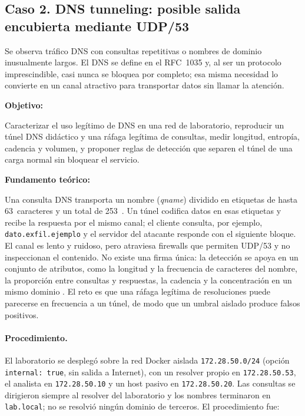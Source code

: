 \subsection{Caso 2. DNS tunneling: posible salida encubierta mediante UDP/53}
\label{caso:dns-tunneling}

\begin{situacion}
Se observa tráfico DNS con consultas repetitivas o nombres de dominio inusualmente largos. El DNS se define en el RFC~1035 \parencite{rfc1035} y, al ser un protocolo imprescindible, casi nunca se bloquea por completo; esa misma necesidad lo convierte en un canal atractivo para transportar datos sin llamar la atención.

\textbf{Objetivo:} \par
Caracterizar el uso legítimo de DNS en una red de laboratorio, reproducir un túnel DNS didáctico y una ráfaga legítima de consultas, medir longitud, entropía, cadencia y volumen, y proponer reglas de detección que separen el túnel de una carga normal sin bloquear el servicio.

\textbf{Fundamento teórico:} \par
Una consulta DNS transporta un nombre (\textit{qname}) dividido en etiquetas de hasta 63~caracteres y un total de 253~\parencite{rfc1035}. Un túnel codifica datos en esas etiquetas y recibe la respuesta por el mismo canal; el cliente consulta, por ejemplo, \texttt{dato.exfil.ejemplo} y el servidor del atacante responde con el siguiente bloque. El canal es lento y ruidoso, pero atraviesa firewalls que permiten UDP/53 y no inspeccionan el contenido. No existe una firma única: la detección se apoya en un conjunto de atributos, como la longitud y la frecuencia de caracteres del nombre, la proporción entre consultas y respuestas, la cadencia y la concentración en un mismo dominio \parencite{amirov2025dns,born2010character,petrov2025domainator}. El reto es que una ráfaga legítima de resoluciones puede parecerse en frecuencia a un túnel, de modo que un umbral aislado produce falsos positivos.
\end{situacion}

\paragraph{Procedimiento.}
El laboratorio se desplegó sobre la red Docker aislada \texttt{172.28.50.0/24} (opción \texttt{internal: true}, sin salida a Internet), con un resolver propio en \texttt{172.28.50.53}, el analista en \texttt{172.28.50.10} y un host pasivo en \texttt{172.28.50.20}. Las consultas se dirigieron siempre al resolver del laboratorio y los nombres terminaron en \texttt{lab.local}; no se resolvió ningún dominio de terceros. El procedimiento fue:

